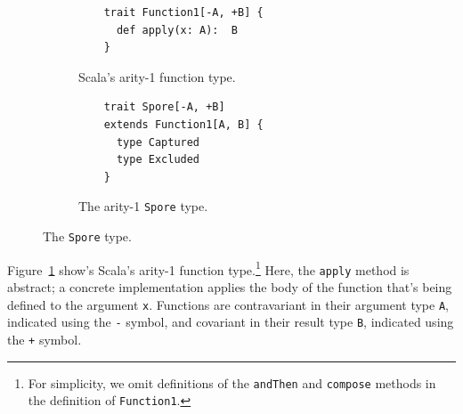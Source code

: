 \documentclass{llncs}
\begin{document}
\begin{figure}[b!]
\vspace{-2mm}
\begin{subfigure}{.5\textwidth}
  \centering
  \begin{lstlisting}
    trait Function1[-A, +B] {
      def apply(x: A):  B
    }
  \end{lstlisting}
  \caption{Scala's arity-1 function type.}
  \label{fig:function-arity1}
\end{subfigure}%
\begin{subfigure}{.5\textwidth}
  \centering
  \begin{lstlisting}
    trait Spore[-A, +B]
    extends Function1[A, B] {
      type Captured
      type Excluded
    }
  \end{lstlisting}
  \caption{The arity-1 \texttt{Spore} type.}
  \label{fig:spore-arity1}
\end{subfigure}%
\vspace{-1mm}
\caption{The \texttt{Spore} type.}
\label{fig:spore-type}
\vspace{-2mm}
\end{figure}

Figure~\ref{fig:function-arity1} show's Scala's arity-1 function type.\footnote{For simplicity, we omit definitions of the \verb+andThen+ and \verb+compose+ methods in the definition of \verb+Function1+.}
Here, the \verb|apply| method is abstract; a concrete implementation applies
the body of the function that's being defined to the argument \verb|x|.
Functions are contravariant in their argument type \verb|A|, indicated using
the \verb|-| symbol, and covariant in their result type \verb|B|, indicated
using the \verb|+| symbol.




\end{document}
